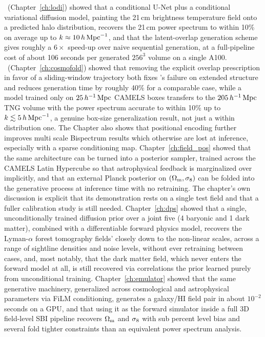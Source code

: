 \LODI\ (Chapter~\ref{ch:lodi}) showed that a conditional U-Net plus a conditional variational diffusion model, painting the 21\,cm brightness temperature field onto a predicted halo distribution, recovers the 21\,cm power spectrum to within 10\% on average up to $k\approx10\,h\,\mathrm{Mpc}^{-1}$, and that the latent-overlap generation scheme gives roughly a $6\times$ speed-up over naive sequential generation, at a full-pipeline cost of about 106 seconds per generated $256^3$ volume on a single A100. \FOLD\ (Chapter~\ref{ch:cosmofold}) showed that removing the explicit overlap prescription in favor of a sliding-window trajectory both fixes \LODI's failure on extended structure and reduces generation time by roughly 40\% for a comparable case, while a model trained only on $25\,h^{-1}\,\mathrm{Mpc}$ CAMELS boxes transfers to the $205\,h^{-1}\,\mathrm{Mpc}$ TNG volume with the power spectrum accurate to within 10\% up to $k\lesssim5\,h\,\mathrm{Mpc}^{-1}$, a genuine box-size generalization result, not just a within distribution one. The Chapter also shows that positional encoding further improves multi scale Bispectrum results which otherwise are lost at inference, especially with a sparse conditioning map. Chapter~\ref{ch:field_pos} showed that the same architecture can be turned into a posterior sampler, trained across the CAMELS Latin Hypercube so that astrophysical feedback is marginalized over implicitly, and that an external Planck posterior on $(\Omega_\mathrm{m},\sigma_8)$ can be folded into the generative process at inference time with no retraining. The chapter's own discussion is explicit that its demonstration rests on a single test field and that a fuller calibration study is still needed. Chapter~\ref{ch:dps} showed that a single, unconditionally trained diffusion prior over a joint five (4 baryonic and 1 dark matter), combined with a differentiable forward physics model, recovers the Lyman-$\alpha$ forest tomography fields' closely down to the non-linear scales, across a range of sightline densities and noise levels, without ever retraining between cases, and, most notably, that the dark matter field, which never enters the forward model at all, is still recovered via correlations the prior learned purely from unconditional training. Chapter~\ref{ch:emulator} showed that the same generative machinery, generalized across cosmological and astrophysical parameters via FiLM conditioning, generates a galaxy/HI field pair in about $10^{-2}$ seconds on a GPU, and that using it as the forward simulator inside a full 3D field-level SBI pipeline recovers $\Omega_\mathrm{m}$ and $\sigma_8$ with sub percent level bias and several fold tighter constraints than an equivalent power spectrum analysis.

